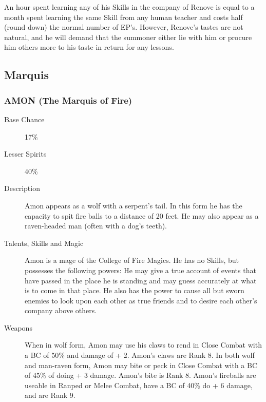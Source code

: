 \begin{multicols*}{2}
\begin{description}
\setlength\itemsep{0pt}

\item[Comments] An hour spent learning any of his Skills in the company of
Renove is equal to a month spent learning the same Skill from any
human teacher and costs half (round down) the normal number of
EP's. However, Renove's tastes are not natural, and he will demand
that the summoner either lie with him or procure him others more to
his taste in return for any lessons.

\end{description}

\subsection{Marquis}

\subsubsection{AMON (The Marquis of Fire)}

\begin{description}

\item[Base Chance] 17\%

\item[Lesser Spirits]40\%

\item[Description] Amon appears as a wolf with a serpent's tail.  In this
form he has the capacity to spit fire balls to a distance of 20 feet.
He may also appear as a raven-headed man (often with a dog's teeth).

\item[Talents, Skills and Magic] Amon is a mage of the College of Fire Magics.  He has no
Skills, but possesses the following powers: He may give a true account
of events that have passed in the place he is standing and may guess
accurately at what is to come in that place.  He also has the power to
cause all but sworn enemies to look upon each other as true friends
and to desire each other's company above others.

\item[Weapons] When in wolf form, Amon may use his claws to rend in Close
Combat with a BC of 50\% and damage of + 2.  Amon's claws are
Rank 8.  In both wolf and man-raven form, Amon may bite or peck in
Close Combat with a BC of 45\% of doing + 3 damage.  Amon's bite
is Rank 8.  Amon's fireballs are useable in Ranped or Melee Combat,
have a BC of 40\% do + 6 damage, and are Rank 9.


\end{description}
\end{multicols*}
